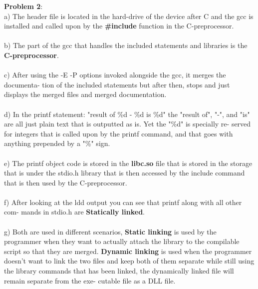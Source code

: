 \documentclass[12pt]{article}
\newcommand{\tab}[0]{\indent \indent}
\begin{document}
\textbf{Problem 2}: \\ \tab a) The header file is located in the hard-drive of the device after C and the gcc is \tab  installed and called upon by the \textbf{\#include} function in the C-preprocessor.  \\\\
\tab b) The part of the gcc that handles the included statements and libraries is the \tab \textbf{C-preprocessor}. \\\\
\tab c) After using the -E -P options invoked alongside the gcc, it merges the documenta- \tab tion of the included statements but after then, stops and just displays the merged \tab files and merged documentation. \\\\	
\tab d) In the printf statement: "result of \%d - \%d is \%d" the "result of", "-", and \tab "is" are all just plain text that is outputted as is. Yet the "\%d" is specially re- \tab served for integers that is called upon by the printf command, and that goes with \tab anything prepended by a "\%" sign. \\\\ 
\tab e) The printf object code is stored in the \textbf{libc.so} file that is stored in the storage \tab that is under the stdio.h library that is then accessed by the include command that \tab is then used by the C-preprocessor. \\\\ 
\tab f) After looking at the ldd output you can see that printf along with all other com- \tab mands in stdio.h are \textbf{Statically linked}. \\\\
\tab g) Both are used in different scenarios, \textbf{Static linking} is used by the programmer \tab when they want to actually attach the library to the compilable script so that they \tab are merged. \textbf{Dynamic linking} is used when the programmer doesn't want to link \tab the two files and keep both of them separate while still using the library commands \tab that has been linked, the dynamically linked file will remain separate from the exe- \tab cutable file as a DLL file.  \\
   
\end{document}
